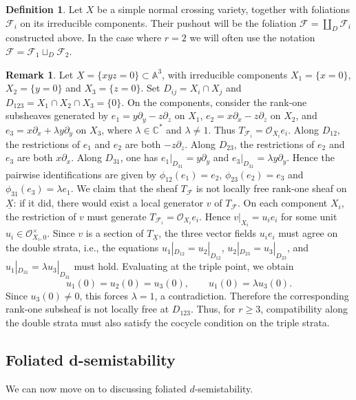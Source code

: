 \documentclass[reqno]{amsart}
\newcommand{\F}{\mathscr{F}}
\theoremstyle{definition}
\newtheorem{definition}[theorem]{Definition}
\newtheorem{remark}[theorem]{Remark}
\theoremstyle{named}
\begin{document}
\begin{definition}
    Let $X$ be a simple normal crossing variety, together with foliations $\F_i$ on its irreducible components. Their pushout will be the foliation $\F=\coprod_D \F_i$ constructed above. In the case where $r=2$ we will often use the notation $\F=\F_1\sqcup_D \F_2$. 
\end{definition}





 \begin{remark}
Let $\underline X=\{xyz=0\}\subset \mathbb A^3$, with irreducible components
$X_1=\{x=0\}$, $X_2=\{y=0\}$ and $X_3=\{z=0\}$. Set
$D_{ij}=X_i\cap X_j$ and $D_{123}=X_1\cap X_2\cap X_3=\{0\}$.
On the components, consider the rank-one subsheaves generated by
$
e_1=y\partial_y-z\partial_z
$
on $X_1$,
$
e_2=x\partial_x-z\partial_z
$
on $X_2$, and
$
e_3=x\partial_x+\lambda y\partial_y
$
on $X_3$, where $\lambda\in\mathbb C^*$ and $\lambda\neq 1$. Thus
$T_{\F_i}=\mathcal O_{X_i}e_i$.
Along $D_{12}$, the restrictions of $e_1$ and $e_2$ are both
$-z\partial_z$. Along $D_{23}$, the restrictions of $e_2$ and $e_3$ are both
$x\partial_x$. Along $D_{31}$, one has
$e_1|_{D_{31}}=y\partial_y$ and
$e_3|_{D_{31}}=\lambda y\partial_y$. Hence the pairwise identifications are
given by
$\phi_{12}(e_1)=e_2$, $\phi_{23}(e_2)=e_3$ and
$\phi_{31}(e_3)=\lambda e_1$.
We claim that the sheaf $T_\F$ is not locally free rank-one sheaf on $\underline X$:
if it did, there would exist a local generator $v$ of $T_{\F}$.
On each component $X_i$, the restriction of $v$ must generate
$T_{\F_i}=\mathcal O_{X_i}e_i$. Hence
$v|_{X_i}=u_i e_i$
for some unit $u_i\in\mathcal O_{X_i,0}^{\times}$.
Since $v$ is a section of $T_{\underline X}$, the three vector fields
$u_i e_i$ must agree on the double strata, i.e., the equations $
u_1|_{D_{12}}=u_2|_{D_{12}}$, 
$u_2|_{D_{23}}=u_3|_{D_{23}}$, 
and 
$u_1|_{D_{31}}=\lambda u_3|_{D_{31}}$ must hold.
Evaluating at the triple point, we obtain
\[
u_1(0)=u_2(0)=u_3(0),
\qquad
u_1(0)=\lambda u_3(0).
\]
Since \(u_3(0)\neq 0\), this forces \(\lambda=1\), a contradiction.
Therefore the corresponding rank-one subsheaf is not locally free at
\(D_{123}\).
Thus, for
$r\geq 3$, compatibility along the double strata must also satisfy the
cocycle condition on the triple strata.
\end{remark}

\subsection{Foliated d-semistability} We can now move on to discussing foliated $d$-semistability.
\end{document}
